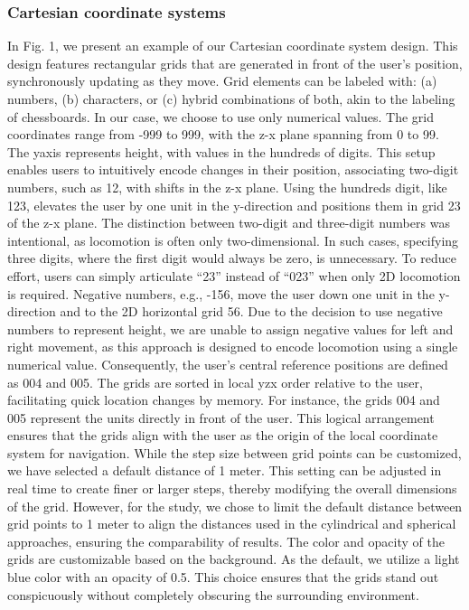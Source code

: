 \documentclass[preprint,12pt]{elsarticle}
\newcommand{\reftext}[1]{{\color{gray}#1}}   %
\begin{document}
\subsubsection{Cartesian coordinate systems}
\reftext{In Fig. 1, we present an example of our Cartesian coordinate system design. This design features rectangular grids that are generated in front of the user's position, synchronously updating as they move. Grid elements can be labeled with: (a) numbers, (b) characters, or (c) hybrid combinations of both, akin to the labeling of chessboards. In our case, we choose to use only numerical values. The grid coordinates range from -999 to 999, with the z-x plane spanning from 0 to 99. The yaxis represents height, with values in the hundreds of digits. This setup enables users to intuitively encode changes in their position, associating two-digit numbers, such as 12, with shifts in the z-x plane. Using the hundreds digit, like 123, elevates the user by one unit in the y-direction and positions them in grid 23 of the z-x plane. The distinction between two-digit and three-digit numbers was intentional, as locomotion is often only two-dimensional. In such cases, specifying three digits, where the first digit would always be zero, is unnecessary. To reduce effort, users can simply articulate ``23'' instead of ``023'' when only 2D locomotion is required. Negative numbers, e.g., -156, move the user down one unit in the y-direction and to the 2D horizontal grid 56. Due to the decision to use negative numbers to represent height, we are unable to assign negative values for left and right movement, as this approach is designed to encode locomotion using a single numerical value. Consequently, the user's central reference positions are defined as 004 and 005. The grids are sorted in local yzx order relative to the user, facilitating quick location changes by memory. For instance, the grids 004 and 005 represent the units directly in front of the user. This logical arrangement ensures that the grids align with the user as the origin of the local coordinate system for navigation. While the step size between grid points can be customized, we have selected a default distance of 1 meter. This setting can be adjusted in real time to create finer or larger steps, thereby modifying the overall dimensions of the grid. However, for the study, we chose to limit the default distance between grid points to 1 meter to align the distances used in the cylindrical and spherical approaches, ensuring the comparability of results. The color and opacity of the grids are customizable based on the background. As the default, we utilize a light blue color with an opacity of 0.5. This choice ensures that the grids stand out conspicuously without completely obscuring the surrounding environment.}
\end{document}

